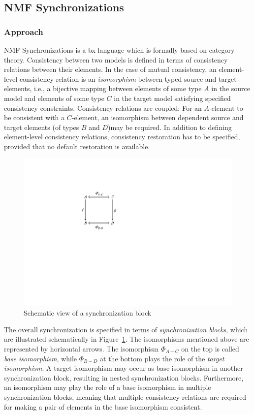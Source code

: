 
\subsection{NMF Synchronizations}
\label{sec:NMF}


\subsubsection{Approach}
\label{sec:ApproachNMF}

NMF Synchronizations \cite{SoSyM2017-Hinkel}is a bx language which is formally based on category theory. Consistency between two models is defined in terms of consistency relations between their elements. In the case of mutual consistency, an element-level consistency relation is an \emph{isomorphism} between typed source and target elements, i.e., a bijective mapping between elements of some type $A$ in the source model and elements of some type $C$ in the target model satisfying specified consistency constraints. Consistency relations are coupled: For an $A$-element to be consistent with a $C$-element, an isomorphism between dependent source and target elements (of types $B$ and $D$)may be required. In addition to defining element-level consistency relations, consistency restoration has to be specified, provided that no default restoration is available.

\begin{figure}[tb!]
	\centering
	\includegraphics[width=0.35\columnwidth]{diagrams/NMFSynchronizationBlock}
	\caption{Schematic view of a synchronization block}
	\label{fig:SynchronizationBlock}
\end{figure}

The overall synchronization is specified in terms of \emph{synchronization blocks}, which are illustrated schematically in Figure~\ref{fig:SynchronizationBlock}. The isomorphisms mentioned above are represented by horizontal arrows. The isomorphism $\varPhi_{A-C}$ on the top is called \emph{base isomorphism}, while $\varPhi_{B-D}$ at the bottom plays the role of the \emph{target isomorphism}. A target isomorphism may occur as base isomorphism in another synchronization block, resulting in nested synchronization blocks. Furthermore, an isomorphism may play the role of a base isomorphism in multiple synchronization blocks, meaning that multiple consistency relations are required for making a pair of elements in the base isomorphism consistent.

